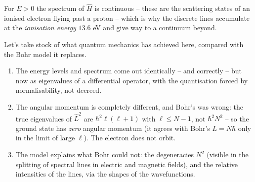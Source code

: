 \begin{center}
\end{center}

For $E > 0$ the spectrum of $\hat{H}$ is continuous -- these are the scattering states of an ionised electron flying past a proton -- which is why the discrete lines accumulate at the \emph{ionisation energy} $13.6$ eV and give way to a continuum beyond.

Let's take stock of what quantum mechanics has achieved here, compared with the Bohr model it replaces.
\begin{enumerate}[label=(\roman*)]
    \item The energy levels and spectrum come out identically -- and correctly -- but now as eigenvalues of a differential operator, with the quantisation forced by normalisability, not decreed.
    \item The angular momentum is completely different, and Bohr's was wrong: the true eigenvalues of $\hat{L}^2$ are $\hbar^2 \ell(\ell+1)$ with $\ell \leq N - 1$, not $\hbar^2 N^2$ -- so the ground state has \emph{zero} angular momentum (it agrees with Bohr's $L = N\hbar$ only in the limit of large $\ell$). The electron does not orbit.
    \item The model explains what Bohr could not: the degeneracies $N^2$ (visible in the splitting of spectral lines in electric and magnetic fields), and the relative intensities of the lines, via the shapes of the wavefunctions.
\end{enumerate}

